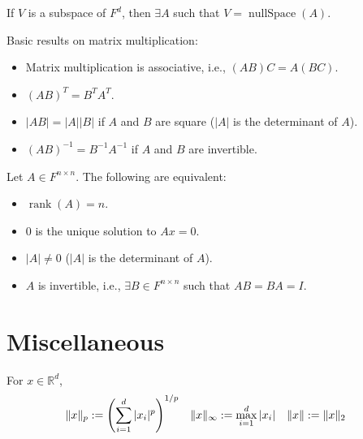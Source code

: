 \documentclass[a4paper,12pt,fleqn]{article}
\newenvironment*{tightemize}{\begin{itemize}[noitemsep]}{\end{itemize}}
\DeclareMathOperator{\rank}{rank}
\DeclareMathOperator{\nullSpace}{nullSpace}
\begin{document}
\begin{theorem}[DWAP]
If $V$ is a subspace of $F^d$, then $\exists A$ such that $V = \nullSpace(A)$.
\end{theorem}

\begin{theorem}[DWAP]
Basic results on matrix multiplication:
\begin{tightemize}
\item Matrix multiplication is associative, i.e., $(AB)C = A(BC)$.
\item $(AB)^T = B^TA^T$.
\item $|AB| = |A||B|$ if $A$ and $B$ are square ($|A|$ is the determinant of $A$).
\item $(AB)^{-1} = B^{-1}A^{-1}$ if $A$ and $B$ are invertible.
\end{tightemize}
\end{theorem}

\begin{theorem}
Let $A \in F^{n \times n}$. The following are equivalent:
\begin{tightemize}
\item $\rank(A) = n$.
\item 0 is the unique solution to $Ax = 0$.
\item $|A| \neq 0$ ($|A|$ is the determinant of $A$).
\item $A$ is invertible, i.e., $\exists B \in F^{n \times n}$ such that $AB = BA = I$.
\end{tightemize}
\end{theorem}

\section{Miscellaneous}

\begin{definition}[$p$-norms]
For $x \in \mathbb{R}^d$,
\begin{align*}
\|x\|_p &:= \left(\sum_{i=1}^d |x_i|^p\right)^{1/p}
& \|x\|_{\infty} &:= \max_{i=1}^d |x_i|
& \|x\| &:= \|x\|_2
\end{align*}
\end{definition}
\end{document}
